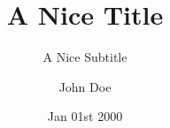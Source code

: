 \documentclass[unknownkeysallowed,show notes,xcolor=table]{beamer}
\title[A Nice Title for the Upper Banner]{A Nice Title}
\subtitle{\scriptsize A Nice Subtitle}
\author{John Doe}
\institute{\vspace{-1em} \texttt{[image: logo1.png]}}
\date{\tiny Jan 01st 2000}
\begin{document}
  
  \titleandoutline
  
  
  
  
  
  \appendices
  
  
\end{document}
